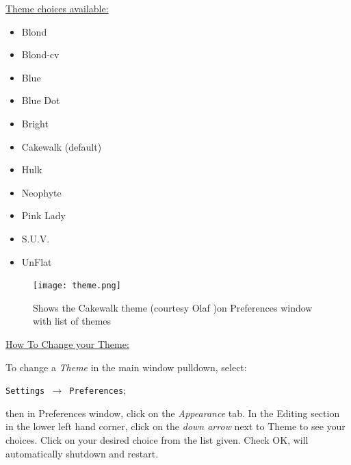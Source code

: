 \underline{Theme choices available:}

\begin{itemize}[noitemsep]
    \item Blond
    \item Blond-cv
    \item Blue
    \item Blue Dot
    \item Bright
    \item Cakewalk (default)
    \item Hulk
    \item Neophyte
    \item Pink Lady
    \item S.U.V.
    \item UnFlat
\end{itemize}


\begin{figure}[htpb]
    \centering \texttt{[image: theme.png]}
    \caption{Shows the Cakewalk theme (courtesy Olaf )on Preferences window with list of themes}
    \label{fig:theme}
\end{figure}


\underline{How To Change your Theme:}

To change a \textit{Theme} in the main window pulldown, select:

\texttt{Settings $\rightarrow$ Preferences};

then in Preferences window, click on the \textit{Appearance} tab. In the Editing section in the lower left hand corner,	click on the \textit{down arrow} next to Theme to see your choices. Click on your desired choice from the list given. Check OK, \CGG{} will automatically shutdown and restart.

